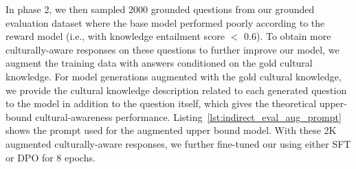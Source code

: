 \documentclass{article} %
\begin{document}
In phase 2, we then sampled 2000 grounded questions from our grounded evaluation dataset where the base model performed poorly according to the reward model (i.e., with knowledge entailment score $<$ 0.6). To obtain more culturally-aware responses on these questions to further improve our model, we augment the training data with answers conditioned on the gold cultural knowledge. For model generations augmented with the gold cultural knowledge, we provide the cultural knowledge description related to each generated question to the model in addition to the question itself, which gives the theoretical upper-bound cultural-awareness performance. Listing~\ref{lst:indirect_eval_aug_prompt} shows the prompt used for the augmented upper bound model. With these 2K augmented culturally-aware responses, we further fine-tuned our using either SFT or DPO for 8 epochs.
\end{document}
